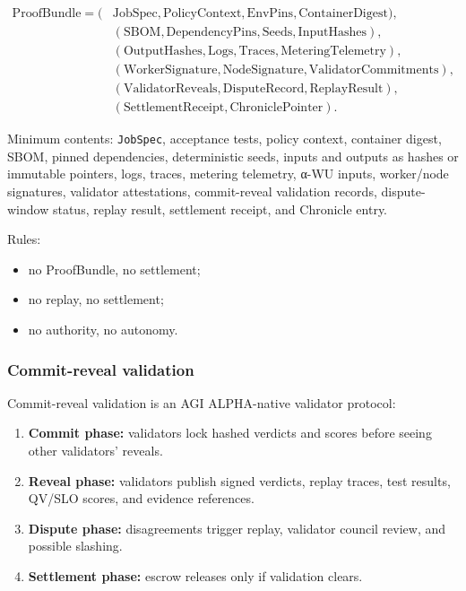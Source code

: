 \[
\begin{aligned}
\mathrm{ProofBundle}=(&\mathrm{JobSpec},\mathrm{PolicyContext},\mathrm{EnvPins},\mathrm{ContainerDigest}),\\
& (\mathrm{SBOM},\mathrm{DependencyPins},\mathrm{Seeds},\mathrm{InputHashes}),\\
& (\mathrm{OutputHashes},\mathrm{Logs},\mathrm{Traces},\mathrm{MeteringTelemetry}),\\
& (\mathrm{WorkerSignature},\mathrm{NodeSignature},\mathrm{ValidatorCommitments}),\\
& (\mathrm{ValidatorReveals},\mathrm{DisputeRecord},\mathrm{ReplayResult}),\\
& (\mathrm{SettlementReceipt},\mathrm{ChroniclePointer}).
\end{aligned}
\]

Minimum contents: \texttt{JobSpec}, acceptance tests, policy context,
container digest, SBOM, pinned dependencies, deterministic seeds, inputs
and outputs as hashes or immutable pointers, logs, traces, metering
telemetry, α-WU inputs, worker/node signatures, validator attestations,
commit-reveal validation records, dispute-window status, replay result,
settlement receipt, and Chronicle entry.

Rules:

\begin{itemize}
\tightlist
\item
  no ProofBundle, no settlement;
\item
  no replay, no settlement;
\item
  no authority, no autonomy.
\end{itemize}

\subsubsection{Commit-reveal validation}\label{commit-reveal-validation}

Commit-reveal validation is an AGI ALPHA-native validator protocol:

\begin{enumerate}
\def\labelenumi{\arabic{enumi}.}
\tightlist
\item
  \textbf{Commit phase:} validators lock hashed verdicts and scores
  before seeing other validators' reveals.
\item
  \textbf{Reveal phase:} validators publish signed verdicts, replay
  traces, test results, QV/SLO scores, and evidence references.
\item
  \textbf{Dispute phase:} disagreements trigger replay, validator
  council review, and possible slashing.
\item
  \textbf{Settlement phase:} escrow releases only if validation clears.
\end{enumerate}

